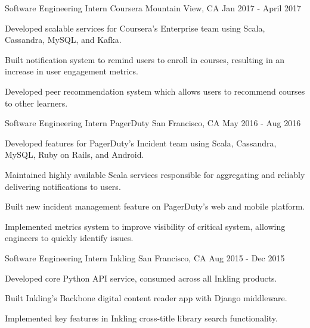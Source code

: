 

\begin{cventries}
  \cventry
    {Software Engineering Intern} %
    {Coursera} %
    {Mountain View, CA} %
    {Jan 2017 - April 2017} %
    {
      \begin{cvitems} %
      \item {Developed scalable services for Coursera's Enterprise team using Scala, Cassandra, MySQL, and Kafka.}
      \item {Built notification system to remind users to enroll in courses, resulting in an increase in user engagement metrics.}
      \item {Developed peer recommendation system which allows users to recommend courses to other learners.}
      \end{cvitems}
    }

  \cventry
    {Software Engineering Intern} %
    {PagerDuty} %
    {San Francisco, CA} %
    {May 2016 - Aug 2016} %
    {
      \begin{cvitems} %
      \item {Developed features for PagerDuty's Incident team using Scala, Cassandra, MySQL, Ruby on Rails, and Android.}
      \item {Maintained highly available Scala services responsible for aggregating and reliably delivering notifications to users.}
      \item {Built new incident management feature on PagerDuty's web and mobile platform.}
      \item {Implemented metrics system to improve visibility of critical system, allowing engineers to quickly identify issues. }
      \end{cvitems}
    }

  \cventry
    {Software Engineering Intern} %
    {Inkling} %
    {San Francisco, CA} %
    {Aug 2015 - Dec 2015} %
    {
      \begin{cvitems} %
      \item {Developed core Python API service, consumed across all Inkling products.}
      \item {Built Inkling's Backbone digital content reader app with Django middleware.}
      \item {Implemented key features in Inkling cross-title library search functionality.}
      \end{cvitems}
    }


\end{cventries}
